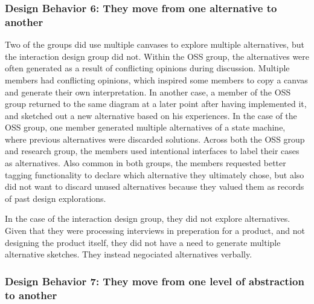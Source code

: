 
\subsubsection{Design Behavior 6: They move from one alternative to another}

Two of the groups did use multiple canvases to explore multiple alternatives, but the interaction design group did not. Within the OSS group, the alternatives were often generated as a result of conflicting opinions during discussion. Multiple members had conflicting opinions, which inspired some members to copy a canvas and generate their own interpretation. In another case, a member of the OSS group returned to the same diagram at a later point after having implemented it, and sketched out a new alternative based on his experiences. In the case of the OSS group, one member generated multiple alternatives of a state machine, where previous alternatives were discarded solutions. Across both the OSS group and research group, the members used intentional interfaces to label their cases as alternatives. Also common in both groups, the members requested better tagging functionality to declare which alternative they ultimately chose, but also did not want to discard unused alternatives because they valued them as records of past design explorations.

In the case of the interaction design group, they did not explore alternatives. Given that they were processing interviews in preperation for a product, and not designing the product itself, they did not have a need to generate multiple alternative sketches. They instead negociated alternatives verbally.

\subsubsection{Design Behavior 7: They move from one level of abstraction to another}

